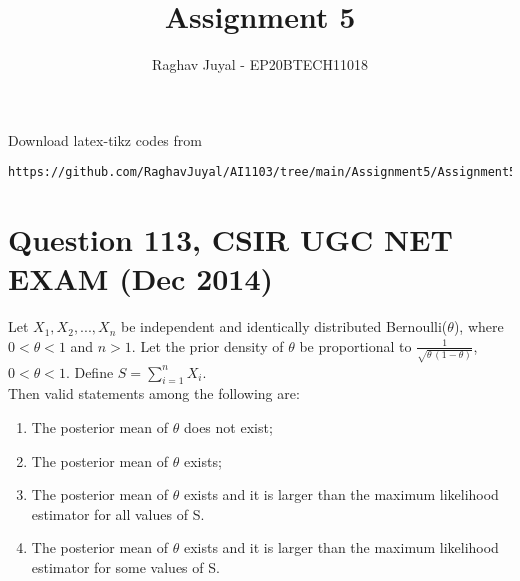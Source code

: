 \documentclass[journal,12pt,twocolumn]{IEEEtran}
\begin{document}
\let\vec\mathbf
\renewcommand{\thefigure}{\theproblem}
\def\putbox#1#2#3{\makebox[0in][l]{\makebox[#1][l]{}\raisebox{\baselineskip}[0in][0in]{\raisebox{#2}[0in][0in]{#3}}}}
     \def\rightbox#1{\makebox[0in][r]{#1}}
     \def\centbox#1{\makebox[0in]{#1}}
     \def\topbox#1{\raisebox{-\baselineskip}[0in][0in]{#1}}
     \def\midbox#1{\raisebox{-0.5\baselineskip}[0in][0in]{#1}}
\vspace{3cm}
\title{Assignment 5}
\author{Raghav Juyal - EP20BTECH11018}
\maketitle
\newpage
\bigskip
\renewcommand{\thefigure}{\theenumi}
\renewcommand{\thetable}{\theenumi}
Download latex-tikz codes from 
%
\begin{lstlisting}
https://github.com/RaghavJuyal/AI1103/tree/main/Assignment5/Assignment5.tex
\end{lstlisting}
\section*{Question 113, CSIR UGC NET EXAM (Dec 2014)}
Let $X_1,X_2,...,X_n$ be independent and identically distributed Bernoulli($\theta$), where $0<\theta<1$ and $n>1$. Let the prior density of $\theta$ be proportional to $\frac{1}{\sqrt{\theta\,(1-\theta)}}$, $0<\theta<1$. Define $S=\sum_{i=1}^nX_i$.\\[1pt] Then valid statements among the following are:
\begin{enumerate}[label = \arabic*.]
    \item The posterior mean of $\theta$ does not exist;
    \item The posterior mean of $\theta$ exists;
    \item The posterior mean of $\theta$ exists and it is larger than the maximum likelihood estimator for all values of S.
    \item The posterior mean of $\theta$ exists and it is larger than the maximum likelihood estimator for some values of S.
\end{enumerate}
\end{document}
